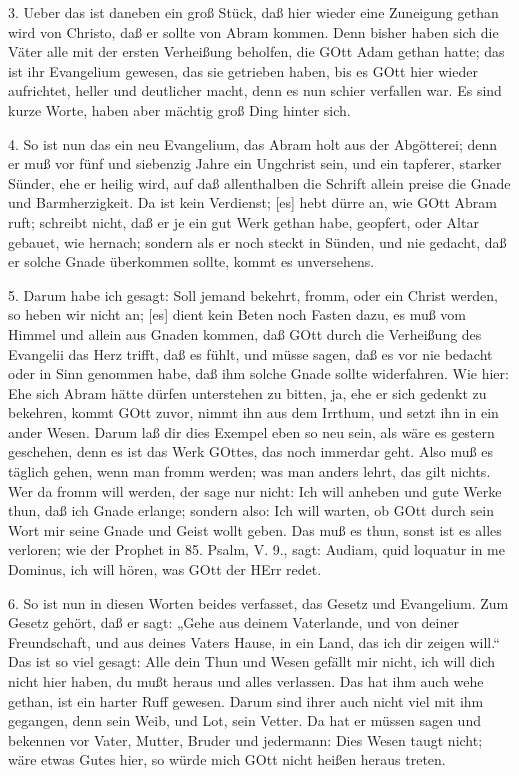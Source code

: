 3. Ueber das ist daneben ein groß Stück, daß hier wieder eine Zuneigung gethan wird von Christo, daß er sollte von Abram kommen. Denn bisher haben sich die Väter alle mit der ersten Verheißung beholfen, die GOtt Adam gethan hatte; das ist ihr Evangelium gewesen, das sie getrieben haben, bis es GOtt hier wieder aufrichtet, heller und deutlicher macht, denn es nun schier verfallen war. Es sind kurze Worte, haben aber mächtig groß Ding hinter sich.

4. So ist nun das ein neu Evangelium, das Abram holt aus der Abgötterei; denn er muß vor fünf und siebenzig Jahre ein Ungchrist sein, und ein tapferer, starker Sünder, ehe er heilig wird, auf daß allenthalben die Schrift allein preise die Gnade und Barmherzigkeit. Da ist kein Verdienst; [es] hebt dürre an, wie GOtt Abram ruft; schreibt nicht, daß er je ein gut Werk gethan habe, geopfert, oder Altar gebauet, wie hernach; sondern als er noch steckt in Sünden, und nie gedacht, daß er solche Gnade überkommen sollte, kommt es unversehens.

5. Darum habe ich gesagt: Soll jemand bekehrt, fromm, oder ein Christ werden, so heben wir nicht an; [es] dient kein Beten noch Fasten dazu, es muß vom Himmel und allein aus Gnaden kommen, daß GOtt durch die Verheißung des Evangelii das Herz trifft, daß es fühlt, und müsse sagen, daß es vor nie bedacht oder in Sinn genommen habe, daß ihm solche Gnade sollte widerfahren. Wie hier: Ehe sich Abram hätte dürfen unterstehen zu bitten, ja, ehe er sich gedenkt zu bekehren, kommt GOtt zuvor, nimmt ihn aus dem Irrthum, und setzt ihn in ein ander Wesen. Darum laß dir dies Exempel eben so neu sein, als wäre es gestern geschehen, denn es ist das Werk GOttes, das noch immerdar geht. Also muß es täglich gehen, wenn man fromm werden; was man anders lehrt, das gilt nichts. Wer da fromm will werden, der sage nur nicht: Ich will anheben und gute Werke thun, daß ich Gnade erlange; sondern also: Ich will warten, ob GOtt durch sein Wort mir seine Gnade und Geist wollt geben. Das muß es thun, sonst ist es alles verloren; wie der Prophet in 85. Psalm, V. 9., sagt: Audiam, quid loquatur in me Dominus, ich will hören, was GOtt der HErr redet.

6. So ist nun in diesen Worten beides verfasset, das Gesetz und Evangelium. Zum Gesetz gehört, daß er sagt: „Gehe aus deinem Vaterlande, und von deiner Freundschaft, und aus deines Vaters Hause, in ein Land, das ich dir zeigen will.“ Das ist so viel gesagt: Alle dein Thun und Wesen gefällt mir nicht, ich will dich nicht hier haben, du mußt heraus und alles verlassen. Das hat ihm auch wehe gethan, ist ein harter Ruff gewesen. Darum sind ihrer auch nicht viel mit ihm gegangen, denn sein Weib, und Lot, sein Vetter. Da hat er müssen sagen und bekennen vor Vater, Mutter, Bruder und jedermann: Dies Wesen taugt nicht; wäre etwas Gutes hier, so würde mich GOtt nicht heißen heraus treten.

